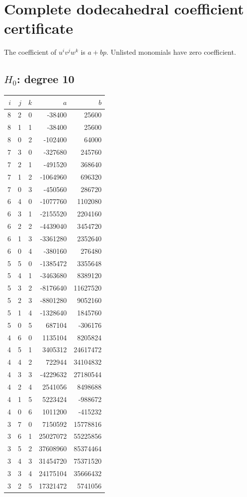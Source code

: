 \section{Complete dodecahedral coefficient certificate}
The coefficient of $u^iv^jw^k$ is $a+bp$. Unlisted monomials have zero coefficient.
\subsection{\texorpdfstring{$H_0$}{H0}: degree 10}
\begin{longtable}{rrr|rr}
$i$&$j$&$k$&$a$&$b$\\\hline\endhead
8&2&0&-38400&25600\\
8&1&1&-38400&25600\\
8&0&2&-102400&64000\\
7&3&0&-327680&245760\\
7&2&1&-491520&368640\\
7&1&2&-1064960&696320\\
7&0&3&-450560&286720\\
6&4&0&-1077760&1102080\\
6&3&1&-2155520&2204160\\
6&2&2&-4439040&3454720\\
6&1&3&-3361280&2352640\\
6&0&4&-380160&276480\\
5&5&0&-1385472&3355648\\
5&4&1&-3463680&8389120\\
5&3&2&-8176640&11627520\\
5&2&3&-8801280&9052160\\
5&1&4&-1328640&1845760\\
5&0&5&687104&-306176\\
4&6&0&1135104&8205824\\
4&5&1&3405312&24617472\\
4&4&2&722944&34104832\\
4&3&3&-4229632&27180544\\
4&2&4&2541056&8498688\\
4&1&5&5223424&-988672\\
4&0&6&1011200&-415232\\
3&7&0&7150592&15778816\\
3&6&1&25027072&55225856\\
3&5&2&37608960&85374464\\
3&4&3&31454720&75371520\\
3&3&4&24175104&35666432\\
3&2&5&17321472&5741056\\

\end{longtable}
